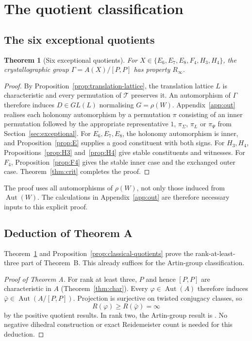 \documentclass[11pt]{article}
\newtheorem{theorem}{Theorem}[section]
\theoremstyle{definition}
\newcommand{\T}{\mathcal{T}}
\newcommand{\Aut}{\operatorname{Aut}}
\newcommand{\Rinf}{R_\infty}
\begin{document}
\section{The quotient classification}\label{sec:quotients}

\subsection{The six exceptional quotients}

\begin{theorem}[Six exceptional quotients]\label{cor:cryst}
For $X\in\{E_6,E_7,E_8,F_4,H_3,H_4\}$, the crystallographic group $\Gamma=A(X)/[P,P]$ has property $\Rinf$.
\end{theorem}

\begin{proof}
By Proposition~\ref{prop:translation-lattice}, the translation lattice $L$ is characteristic
and every permutation of $\T$ preserves it. An automorphism of $\Gamma$ therefore induces
$D\in GL(L)$ normalising $G=\rho(W)$.
Appendix~\ref{app:out} realises each holonomy automorphism by a permutation $\pi$ consisting of an inner permutation followed by
the appropriate representative $1$, $\pi_\Sigma$, $\pi_L$ or $\pi_\Psi$ from Section~\ref{sec:exceptional}.
For $E_6,E_7,E_8$, the holonomy automorphism is inner,
and Proposition~\ref{prop:E} supplies a good constituent with both signs.
For $H_3,H_4$, Propositions~\ref{prop:H3} and~\ref{prop:H4} give stable constituents and witnesses.
For $F_4$, Proposition~\ref{prop:F4} gives the stable inner case and the exchanged outer case.
Theorem~\ref{thm:crit} completes the proof.
\end{proof}

The proof uses all automorphisms of $\rho(W)$, not only those induced from $\Aut(W)$.
The calculations in Appendix~\ref{app:out} are therefore necessary inputs to this explicit proof.

\subsection{Deduction of Theorem A}

Theorem~\ref{cor:cryst} and Proposition~\ref{prop:classical-quotients} prove the rank-at-least-three
part of Theorem~B. This already suffices for the Artin-group classification.

\begin{proof}[Proof of Theorem A]
For rank at least three, $P$ and hence $[P,P]$ are characteristic in $A$
(Theorem~\ref{thm:char}). Every $\varphi\in\Aut(A)$ therefore induces
$\bar\varphi\in\Aut(A/[P,P])$. Projection is surjective on twisted conjugacy classes, so
\[
R(\varphi)\ge R(\bar\varphi)=\infty
\]
by the positive quotient results. In rank two, the Artin-group result is
\cite[Thm.~1]{CS22}. No negative dihedral construction or exact Reidemeister count is needed
for this deduction.
\end{proof}
\end{document}
